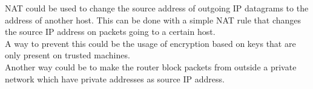 NAT could be used to change the source address of outgoing IP datagrams to the address of another host.
This can be done with a simple NAT rule that changes the source IP address on packets going to a certain host. \\

A way to prevent this could be the usage of encryption based on keys that are only present on trusted machines. \\
Another way could be to make the router block packets from outside a private network which have private addresses as source IP address.
